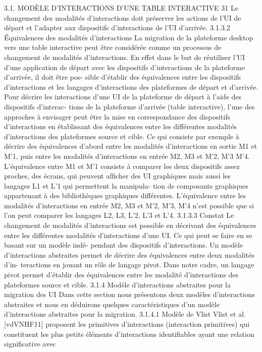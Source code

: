\documentclass{article}
\begin{document}
3.1. MODÈLE D’INTERACTIONS D’UNE TABLE INTERACTIVE
31
Le changement des modalités d’interactions doit préserver les actions de l’UI de départ et
l’adapter aux dispositifs d’interactions de l’UI d’arrivée.
3.1.3.2
Équivalences des modalités d’interactions
La migration de la plateforme desktop vers une table interactive peut être considérée comme un
processus de changement de modalités d’interactions. En effet dans le but de réutiliser l’UI d’une
application de départ avec les dispositifs d’interactions de la plateforme d’arrivée, il doit être pos-
sible d’établir des équivalences entre les dispositifs d’interactions et les langages d’interactions des
plateformes de départ et d’arrivée.
Pour décrire les interactions d’une UI de la plateforme de départ à l’aide des dispositifs d’interac-
tions de la plateforme d’arrivée (table interactive), l’une des approches à envisager peut être la mise
en correspondance des dispositifs d’interactions en établissant des équivalences entre les différentes
modalités d’interactions des plateformes source et cible. Ce qui consiste par exemple à décrire des
équivalences d’abord entre les modalités d’interactions en sortie M1 et M’1, puis entre les modalités
d’interactions en entrée M2, M3 et M’2, M’3 M’4.
L’équivalence entre M1 et M’1 consiste à comparer les deux dispositifs assez proches, des écrans,
qui peuvent afﬁcher des UI graphiques mais aussi les langages L1 et L’1 qui permettent la manipula-
tion de composants graphiques appartenant à des bibliothèques graphiques différentes. L’équivalence
entre les modalités d’interactions en entrée M2, M3 et M’2, M’3, M’4 n’est possible que si l’on peut
comparer les langages L2, L3, L’2, L’3 et L’4.
3.1.3.3
Constat
Le changement de modalités d’interactions est possible en décrivant des équivalences entre les
différentes modalités d’interactions d’une UI. Ce qui peut se faire en se basant sur un modèle indé-
pendant des dispositifs d’interactions.
Un modèle d’interactions abstraites permet de décrire des équivalences entre deux modalités d’in-
teractions en jouant un rôle de langage pivot. Dans notre cadre, un langage pivot permet d’établir des
équivalences entre les modalité d’interactions des plateformes source et cible.
3.1.4
Modèle d’interactions abstraites pour la migration des UI
Dans cette section nous présentons deux modèles d’interactions abstraites et nous en déduirons
quelques caractéristiques d’un modèle d’interactions abstraites pour la migration.
3.1.4.1
Modèle de Vlist
Vlist et al.
[vdVNHF11] proposent les primitives d’interactions (interaction primitives) qui
constituent les plus petits éléments d’interactions identiﬁables ayant une relation signiﬁcative avec
\end{document}
